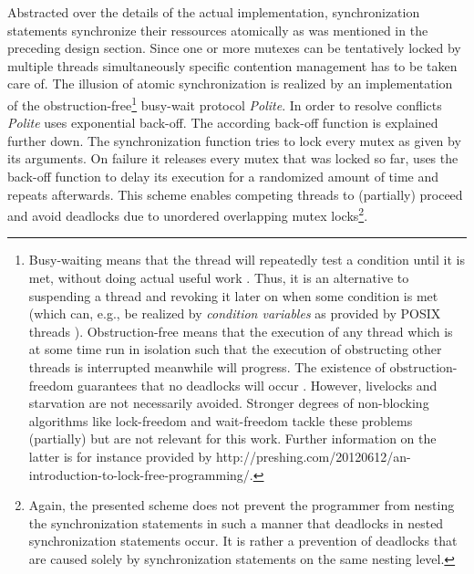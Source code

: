 Abstracted over the details of the actual implementation, synchronization statements synchronize their ressources atomically as was mentioned in the preceding design section. Since one or more mutexes can be tentatively locked by multiple threads simultaneously specific contention management has to be taken care of. The illusion of atomic synchronization is realized by an implementation of the obstruction-free\footnote{Busy-waiting means that the thread will repeatedly test a condition until it is met, without doing actual useful work \cite[p.~166]{AnIntroductionToParallelProgramming}. Thus, it is an alternative to suspending a thread and revoking it later on when some condition is met (which can, e.g., be realized by \textit{condition variables} as provided by POSIX threads \cite[p.~77]{ProgrammingWithPOSIXThreads}). Obstruction-free means that the execution of any thread which is at some time run in isolation such that the execution of obstructing other threads is interrupted meanwhile will progress. The existence of obstruction-freedom guarantees that no deadlocks will occur \cite{ObstructionFreeAuthorizationEnforcement}. However, livelocks and starvation are not necessarily avoided. Stronger degrees of non-blocking algorithms like lock-freedom and wait-freedom tackle these problems (partially) but are not relevant for this work. Further information on the latter is for instance provided by http://preshing.com/20120612/an-introduction-to-lock-free-programming/. %
} busy-wait protocol \textit{Polite}. In order to resolve conflicts \textit{Polite} uses exponential back-off. The according back-off function is explained further down. The synchronization function tries to lock every mutex as given by its arguments. On failure it releases every mutex that was locked so far, uses the back-off function to delay its execution for a randomized amount of time and repeats afterwards. This scheme enables competing threads to (partially) proceed and avoid deadlocks due to unordered overlapping mutex locks\footnote{Again, the presented scheme does not prevent the programmer from nesting the synchronization statements in such a manner that deadlocks in nested synchronization statements occur. It is rather a prevention of deadlocks that are caused solely by synchronization statements on the same nesting level.}.
